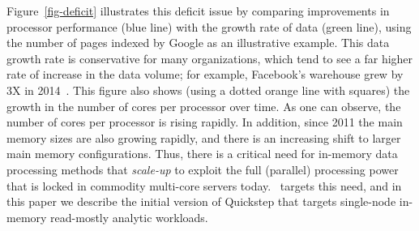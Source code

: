 Figure~\ref{fig-deficit} illustrates this deficit issue by comparing improvements in processor performance (blue line) with the growth rate of data (green line), using the number of pages indexed by Google as an illustrative example. This data growth rate is conservative for many organizations, which tend to see a far higher rate of increase in the data volume; for example, Facebook's warehouse grew by 3X in 2014~\cite{fb-growth-14}. This figure also shows (using a dotted orange line with squares) the growth in the number of cores per processor over time. As one can observe, the number of cores per processor is rising rapidly. %
In addition, %
since 2011 the main memory sizes are also growing rapidly, and there is an increasing shift to larger main memory configurations. Thus, there is a critical need for in-memory data processing methods that \textit{scale-up} to exploit the full (parallel) processing power that is  locked in commodity multi-core servers today. \Quickstep\ targets this need, and in this paper we describe the initial version of Quickstep that targets single-node %
in-memory read-mostly analytic workloads.





